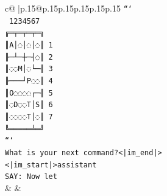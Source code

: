 \documentclass{article}
\begin{document}
{\begin{supertabular}{c@{$\;$}|p{.15\linewidth}@{}p{.15\linewidth}p{.15\linewidth}p{.15\linewidth}p{.15\linewidth}p{.15\linewidth}}
{{{\texttt{```} \\
\texttt{ 1234567} \\
\texttt{╔═╤═╤═╤═╗} \\
\texttt{║A│◌│◌│◌║ 1} \\
\texttt{╟─┴─┼─┤◌║ 2} \\
\texttt{║◌◌M│◌└─╢ 3} \\
\texttt{╟───┘P◌◌║ 4} \\
\texttt{║O◌◌◌◌┌─╢ 5} \\
\texttt{║◌D◌◌T│S║ 6} \\
\texttt{║◌◌◌◌T│◌║ 7} \\
\texttt{╚═════╧═╝} \\
\texttt{```} \\
\texttt{What is your next command?<|im\_end|>} \\
\texttt{<|im\_start|>assistant} \\
\texttt{SAY: Now let} \\
            }
        }
    }
    & & \\ \\


\end{supertabular}}
\end{document}
